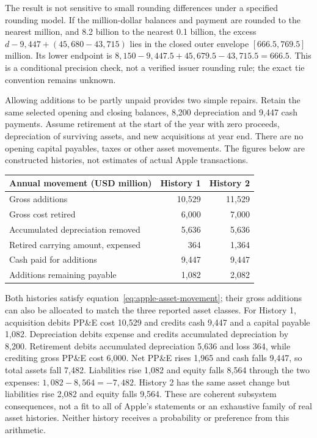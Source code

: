 The result is not sensitive to small rounding differences under a specified
rounding model. If the million-dollar balances and payment are rounded to the
nearest million, and 8.2 billion to the nearest 0.1 billion, the excess
$d-9{,}447+(45{,}680-43{,}715)$ lies in the closed outer envelope
$[666.5,769.5]$ million. Its lower endpoint is
$8{,}150-9{,}447.5+45{,}679.5-43{,}715.5=666.5$.
This is a conditional precision check, not a verified issuer rounding rule;
the exact tie convention remains unknown.

Allowing additions to be partly unpaid provides two simple repairs. Retain
the same selected opening and closing balances, 8,200 depreciation and 9,447
cash payments. Assume retirement at the start of the year with zero proceeds,
depreciation of surviving assets, and new acquisitions at year end. There are
no opening capital payables, taxes or other asset movements. The figures below
are constructed histories, not estimates of actual Apple transactions.

\begin{center}
\begin{tabularx}{\linewidth}{@{}Xrr@{}}
\toprule
Annual movement (USD million) & History 1 & History 2\\\midrule
Gross additions & 10,529 & 11,529\\
Gross cost retired & 6,000 & 7,000\\
Accumulated depreciation removed & 5,636 & 5,636\\
Retired carrying amount, expensed & 364 & 1,364\\
Cash paid for additions & 9,447 & 9,447\\
Additions remaining payable & 1,082 & 2,082\\\bottomrule
\end{tabularx}
\end{center}

Both histories satisfy equation~\eqref{eq:apple-asset-movement}; their gross
additions can also be allocated to match the three reported asset classes.
For History 1, acquisition debits PP\&E cost 10,529 and credits cash 9,447 and
a capital payable 1,082. Depreciation debits expense and credits accumulated
depreciation by 8,200. Retirement debits accumulated depreciation 5,636 and
loss 364, while crediting gross PP\&E cost 6,000. Net PP\&E rises 1,965 and
cash falls 9,447, so total assets fall 7,482. Liabilities rise 1,082 and equity
falls 8,564 through the two expenses: $1{,}082-8{,}564=-7{,}482$.
History 2 has the same asset change but liabilities rise 2,082 and equity
falls 9,564. These are coherent subsystem consequences, not a fit to all of
Apple's statements or an exhaustive family of real asset histories. Neither
history receives a probability or preference from this arithmetic.

